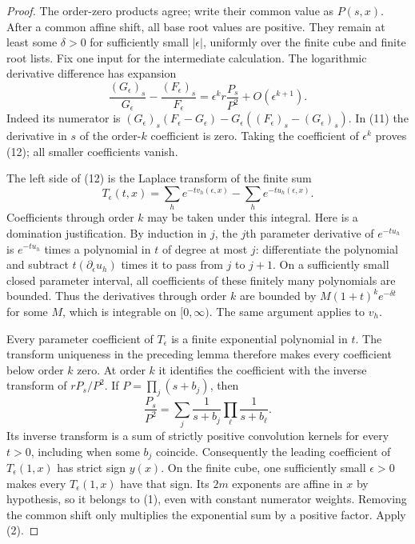 \documentclass[11pt]{article}
\begin{document}
\begin{proof}
The order-zero products agree; write their common value as $P(s,x)$.
After a common affine shift, all base root values are positive.
They remain at least some $\delta>0$ for sufficiently small
$|\epsilon|$, uniformly over the finite cube and finite root lists.
Fix one input for the intermediate calculation. The logarithmic
derivative difference has expansion
\[
 \frac{(G_\epsilon)_s}{G_\epsilon}
       -\frac{(F_\epsilon)_s}{F_\epsilon}
       =\epsilon^k r\frac{P_s}{P^2}
                                 +O(\epsilon^{k+1}).
\tag{12}
\]
Indeed its numerator is
$(G_\epsilon)_s(F_\epsilon-G_\epsilon)
 -G_\epsilon((F_\epsilon)_s-(G_\epsilon)_s)$.
In (11) the derivative in $s$ of the order-$k$ coefficient is zero.
Taking the coefficient of $\epsilon^k$ proves (12); all smaller
coefficients vanish.

The left side of (12) is the Laplace transform of the finite sum
\[
 T_\epsilon(t,x)=\sum_h e^{-t v_h(\epsilon,x)}
                         -\sum_h e^{-t u_h(\epsilon,x)}.
\]
Coefficients through order $k$ may be taken under this integral.
Here is a domination justification. By induction in $j$, the
$j$th parameter derivative of $e^{-t u_h}$ is $e^{-t u_h}$
times a polynomial in $t$ of degree at most $j$: differentiate
the polynomial and subtract $t(\partial_\epsilon u_h)$ times
it to pass from $j$ to $j+1$. On a sufficiently small closed
parameter interval, all coefficients of these finitely many
polynomials are bounded. Thus the derivatives through order $k$
are bounded by $M(1+t)^k e^{-\delta t}$ for some $M$, which
is integrable on $[0,\infty)$. The same argument applies to $v_h$.

Every parameter coefficient of $T_\epsilon$ is a finite exponential
polynomial in $t$. The transform uniqueness in the preceding lemma
therefore makes every coefficient below order $k$ zero. At order
$k$ it identifies the coefficient with the inverse transform of
$rP_s/P^2$. If $P=\prod_j(s+b_j)$, then
\[
 \frac{P_s}{P^2}=\sum_j\frac1{s+b_j}\prod_\ell\frac1{s+b_\ell}.
\]
Its inverse transform is a sum of strictly positive convolution
kernels for every $t>0$, including when some $b_j$ coincide.
Consequently the leading coefficient of $T_\epsilon(1,x)$ has
strict sign $y(x)$. On the finite cube, one sufficiently small
$\epsilon>0$ makes every $T_\epsilon(1,x)$ have that sign.
Its $2m$ exponents are affine in $x$ by hypothesis, so it belongs
to (1), even with constant numerator weights. Removing the common
shift only multiplies the exponential sum by a positive factor.
Apply (2).
\end{proof}
\end{document}
